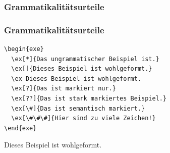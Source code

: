 \subsubsection{Grammatikalitätsurteile}
\begin{frame}[fragile]

\frametitle{Grammatikalitätsurteile}

\begin{lstlisting}
\begin{exe}
  \ex[*]{Das ungrammatischer Beispiel ist.}
  \ex[]{Dieses Beispiel ist wohlgeformt.}	
  \ex Dieses Beispiel ist wohlgeformt.	
  \ex[?]{Das ist markiert nur.}
  \ex[??]{Das ist stark markiertes Beispiel.}
  \ex[\#]{Das ist semantisch markiert.}
  \ex[\#\#\#]{Hier sind zu viele Zeichen!}
\end{exe}
\end{lstlisting}

\end{frame}


\begin{frame}


\begin{exe}
	\ex Dieses Beispiel ist wohlgeformt.	
\end{exe}

\end{frame}


